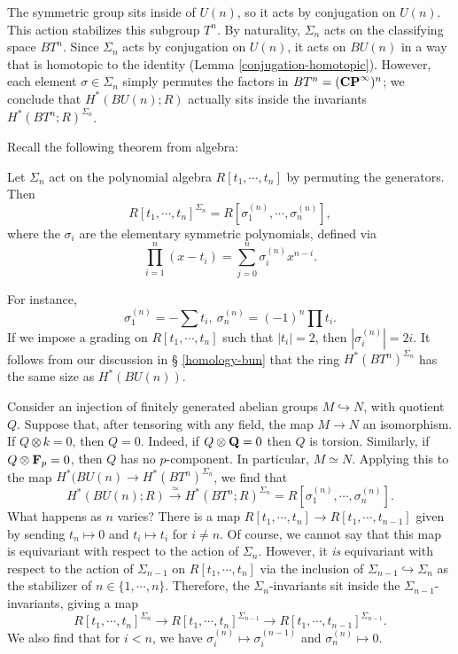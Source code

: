 The symmetric group sits inside of $U(n)$, so it acts by conjugation on $U(n)$.
This action stabilizes this subgroup $T^n$. By naturality, $\Sigma_n$ acts on
the classifying space $BT^n$. Since $\Sigma_n$ acts by conjugation on $U(n)$,
it acts on $BU(n)$ in a way that is homotopic to the identity (Lemma
\ref{conjugation-homotopic}). However, each element $\sigma\in \Sigma_n$ simply
permutes the factors in $BT^n = (\mathbf{CP}^\infty)^n$; we conclude that
$H^\ast(BU(n);R)$ actually sits inside the invariants
$H^\ast(BT^n;R)^{\Sigma_n}$.

Recall the following theorem from algebra:
\begin{theorem}
    Let $\Sigma_n$ act on the polynomial algebra $R[t_1,\cdots,t_n]$ by
    permuting the generators. Then
    $$R[t_1,\cdots,t_n]^{\Sigma_n} = R[\sigma_1^{(n)},\cdots,\sigma_n^{(n)}],$$
    where the $\sigma_i$ are the {elementary symmetric polynomials}, defined
    via
    $$\prod^n_{i=1}(x-t_i) = \sum^n_{j=0} \sigma_i^{(n)}x^{n-i}.$$
\end{theorem}
For instance,
$$\sigma_1^{(n)} = -\sum t_i,\ \sigma_n^{(n)} = (-1)^n\prod t_i.$$
If we impose a grading on $R[t_1,\cdots,t_n]$ such that $|t_i| = 2$, then
$|\sigma_i^{(n)}| = 2i$. It follows from our discussion in \S
\ref{homology-bun} that the ring $H^\ast(BT^n)^{\Sigma_n}$ has the same size as
$H^\ast(BU(n))$.

Consider an injection of finitely generated abelian groups $M\hookrightarrow
N$, with quotient $Q$. Suppose that, after tensoring with any field, the map
$M\to N$ an isomorphism. If $Q\otimes k = 0$, then $Q = 0$.
Indeed, if $Q\otimes \mathbf Q = 0$ then $Q$ is torsion. Similarly, if $Q\otimes
\mathbf F_p = 0$, then $Q$ has no $p$-component. In particular, $M\simeq N$. Applying
this to the map $H^\ast(BU(n)\to H^\ast(BT^n)^{\Sigma_n}$, we find that
$$
H^\ast(BU(n);R) \xrightarrow{\simeq} H^\ast(BT^n;R)^{\Sigma_n} =
R[\sigma_1^{(n)},\cdots,\sigma_n^{(n)}].
$$
What happens as $n$ varies? There is a map $R[t_1,\cdots,t_n] \to
R[t_1,\cdots,t_{n-1}]$ given by sending $t_n\mapsto 0$ and $t_i\mapsto t_i$ for
$i\neq n$. Of course, we cannot say that this map is equivariant with respect
to the action of $\Sigma_n$. However, it \emph{is} equivariant with respect to
the action of $\Sigma_{n-1}$ on $R[t_1,\cdots,t_n]$ via the inclusion of
$\Sigma_{n-1}\hookrightarrow \Sigma_n$ as the stabilizer of
$n\in\{1,\cdots,n\}$. Therefore, the $\Sigma_n$-invariants sit inside the
$\Sigma_{n-1}$-invariants, giving a map
$$
R[t_1,\cdots,t_n]^{\Sigma_n} \to R[t_1,\cdots,t_n]^{\Sigma_{n-1}} \to
R[t_1,\cdots,t_{n-1}]^{\Sigma_{n-1}}.
$$
We also find that for $i<n$, we have $\sigma_i^{(n)} \mapsto \sigma_i^{(n-1)}$
and $\sigma_n^{(n)} \mapsto 0$.
